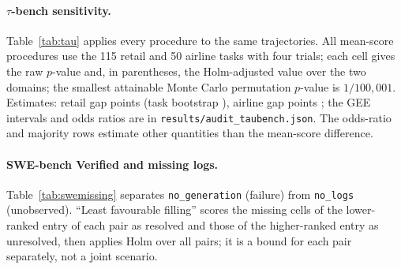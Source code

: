 \paragraph{$\tau$-bench sensitivity.}\label{app:taubench} Table~\ref{tab:tau} applies every procedure to the same trajectories. All mean-score procedures use the 115 retail and 50 airline tasks with four trials; each cell gives the raw $p$-value and, in parentheses, the Holm-adjusted value over the two domains; the smallest attainable Monte Carlo permutation $p$-value is $1/100{,}001$. Estimates: retail gap \tauRetailDiff{} points (task bootstrap \tauRetailCI), airline gap \tauAirlineDiff{} points \tauAirlineCI{}; the GEE intervals and odds ratios are in \texttt{results/audit\_taubench.json}. The odds-ratio and majority rows estimate other quantities than the mean-score difference.
\begin{table}[!tbp]
\centering\footnotesize
\caption{Sensitivity of the $\tau$-bench retail and airline inference to the analysis choice (gpt-4o versus Claude 3.5 Sonnet; raw $p$-values, two-sided).}\label{tab:tau}

\end{table}

\paragraph{SWE-bench Verified and missing logs.}\label{app:swemissing} Table~\ref{tab:swemissing} separates \texttt{no\_generation} (failure) from \texttt{no\_logs} (unobserved). ``Least favourable filling'' scores the missing cells of the lower-ranked entry of each pair as resolved and those of the higher-ranked entry as unresolved, then applies Holm over all pairs; it is a bound for each pair separately, not a joint scenario.
\begin{table}[!tbp]
\centering\footnotesize
\caption{SWE-bench Verified: distinguishability under alternative treatments of unobserved instances.}\label{tab:swemissing}

\end{table}

